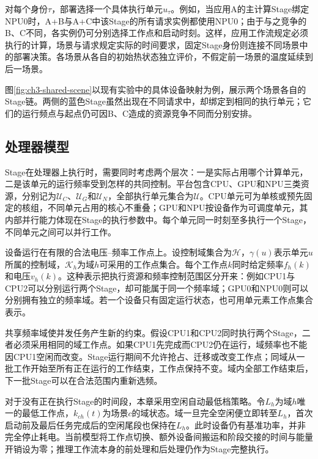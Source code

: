 对每个身份$\tau$，部署选择一个具体执行单元$u_\tau$。例如，当应用A的主计算Stage绑定NPU0时，A+B与A+C中该Stage的所有请求实例都使用NPU0；由于与之竞争的B、C不同，各实例仍可分别选择工作点和启动时刻。这样，应用工作流规定必须执行的计算，场景与请求规定实际的时间要求，固定Stage身份则连接不同场景中的部署决策。各场景从各自的初始热状态独立评价，不假定前一场景的温度延续到后一场景。

图\ref{fig:ch3-shared-scene}以现有实验中的具体设备映射为例，展示两个场景各自的Stage链。两侧的蓝色Stage虽然出现在不同请求中，却绑定到相同的执行单元；它们的运行频点与起点仍可因B、C造成的资源竞争不同而分别安排。



\subsection{处理器模型}

Stage在处理器上执行时，需要同时考虑两个层次：一是实际占用哪个计算单元，二是该单元的运行频率受到怎样的共同控制。平台包含CPU、GPU和NPU三类资源，分别记为$\mathcal U_C$、$\mathcal U_G$和$\mathcal U_N$，全部执行单元集合为$\mathcal U$。CPU单元可为单核或预先固定的核组，不同单元占用的核心不重叠；GPU和NPU按设备作为可调度单元，其内部并行能力体现在Stage的执行参数中。每个单元同一时刻至多执行一个Stage，不同单元之间可以并行工作。

设备运行在有限的合法电压--频率工作点上。设控制域集合为$\mathcal H$，$\gamma(u)$表示单元$u$所属的控制域，$\mathcal K_h$为域$h$可采用的工作点集合。每个工作点$k$同时给定频率$f_h(k)$和电压$v_h(k)$。这种表示把执行资源和频率控制范围区分开来：例如CPU1与CPU2可以分别运行两个Stage，却可能属于同一个频率域；GPU0和NPU0则可以分别拥有独立的频率域。若一个设备只有固定运行状态，也可用单元素工作点集合表示。

共享频率域使并发任务产生新的约束。假设CPU1和CPU2同时执行两个Stage，二者必须采用相同的域工作点。如果CPU1先完成而CPU2仍在运行，域频率也不能因CPU1空闲而改变。Stage运行期间不允许抢占、迁移或改变工作点；同域从一批工作开始至所有正在运行的工作结束，工作点保持不变。域内全部工作结束后，下一批Stage可以在合法范围内重新选频。

对于没有正在执行Stage的时间段，本章采用空闲自动最低档策略。令$L_h$为域$h$唯一的最低工作点，$k_{ch}(t)$为场景$c$的域状态。域一旦完全空闲便立即转至$L_h$，首次启动前及最后任务完成后的空闲尾段也保持在$L_h$。此时设备仍有基准功率，并非完全停止耗电。当前模型将工作点切换、额外设备间搬运和阶段交接的时间与能量开销设为零；推理工作流本身的前处理和后处理仍作为Stage完整执行。

